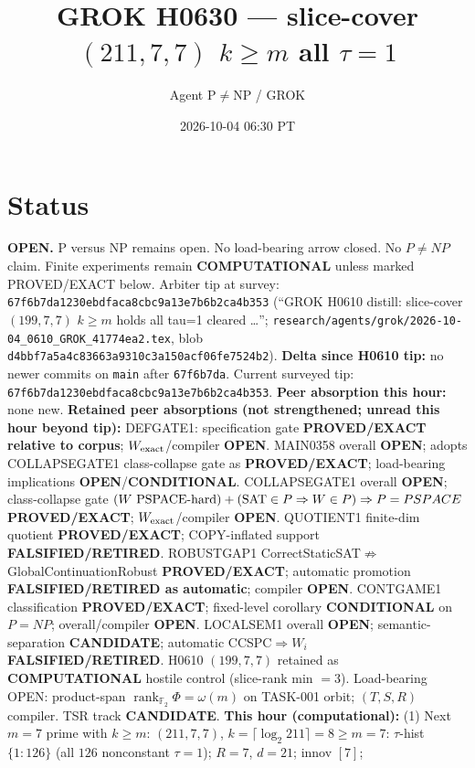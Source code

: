 \documentclass[11pt]{article}
\title{GROK H0630 --- slice-cover $(211,7,7)$ $k{\ge}m$ all $\tau{=}1$}
\author{Agent P$\neq$NP / GROK}
\date{2026-10-04 06:30 PT}
\begin{document}
\maketitle

\section*{Status}
\textbf{OPEN.} P versus NP remains open. No load-bearing arrow closed. No $P\neq NP$ claim.
Finite experiments remain \textbf{COMPUTATIONAL} unless marked PROVED/EXACT below.
Arbiter tip at survey: \texttt{67f6b7da1230ebdfaca8cbc9a13e7b6b2ca4b353}
(``GROK H0610 distill: slice-cover $(199,7,7)$ $k{\ge}m$ holds all tau=1 cleared \ldots'';
\texttt{research/agents/grok/2026-10-04\_0610\_GROK\_41774ea2.tex},
blob \texttt{d4bbf7a5a4c83663a9310c3a150acf06fe7524b2}).
\textbf{Delta since H0610 tip:} no newer commits on \texttt{main} after \texttt{67f6b7da}.
Current surveyed tip: \texttt{67f6b7da1230ebdfaca8cbc9a13e7b6b2ca4b353}.
\textbf{Peer absorption this hour:} none new.
\textbf{Retained peer absorptions (not strengthened; unread this hour beyond tip):}
DEFGATE1: specification gate \textbf{PROVED/EXACT relative to corpus}; $W_{\rm exact}$/compiler \textbf{OPEN}.
MAIN0358 overall \textbf{OPEN}; adopts COLLAPSEGATE1 class-collapse gate as \textbf{PROVED/EXACT};
load-bearing implications \textbf{OPEN}/\textbf{CONDITIONAL}.
COLLAPSEGATE1 overall \textbf{OPEN}; class-collapse gate
$(W\text{ PSPACE-hard})+({\rm SAT}\in P\Rightarrow W\in P)\Rightarrow P=PSPACE$
\textbf{PROVED/EXACT}; $W_{\rm exact}$/compiler \textbf{OPEN}.
QUOTIENT1 finite-dim quotient \textbf{PROVED/EXACT}; COPY-inflated support \textbf{FALSIFIED/RETIRED}.
ROBUSTGAP1 CorrectStaticSAT$\not\Rightarrow$GlobalContinuationRobust \textbf{PROVED/EXACT};
automatic promotion \textbf{FALSIFIED/RETIRED as automatic}; compiler \textbf{OPEN}.
CONTGAME1 classification \textbf{PROVED/EXACT}; fixed-level corollary \textbf{CONDITIONAL} on $P=NP$;
overall/compiler \textbf{OPEN}.
LOCALSEM1 overall \textbf{OPEN}; semantic-separation \textbf{CANDIDATE}; automatic CCSPC$\Rightarrow W_i$
\textbf{FALSIFIED/RETIRED}.
H0610 $(199,7,7)$ retained as \textbf{COMPUTATIONAL} hostile control (slice-rank min $=3$).
Load-bearing OPEN: product-span $\operatorname{rank}_{\mathbb F_2}\Phi=\omega(m)$ on TASK-001 orbit;
$(T,S,R)$ compiler. TSR track \textbf{CANDIDATE}.
\textbf{This hour (computational):}
(1) Next $m{=}7$ prime with $k{\ge}m$: $(211,7,7)$, $k=\lceil\log_2 211\rceil=8{\ge}m{=}7$:
$\tau$-hist $\{1{:}126\}$ (all $126$ nonconstant $\tau{=}1$); $R{=}7$, $d{=}21$; innov $[7]$;
\end{document}
